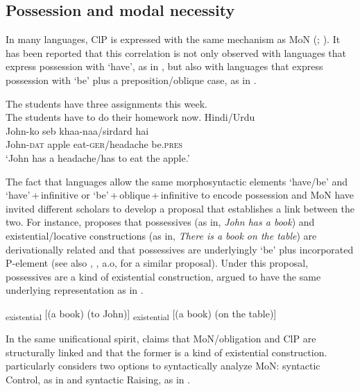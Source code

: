 \documentclass[output=paper]{langscibook}
\begin{document}
\subsection{Possession and modal necessity}\largerpage[2]
In many languages, ClP is expressed with the same mechanism as MoN (\citealt{bhatt97}; \citealt{cowperandbjorkman2016}). It has been reported that this correlation is not only observed with languages that express possession with `have', as in , but also with languages that express possession with `be' plus a preposition/oblique case, as in .

\ea\label{ex:Gebregziabher:have}
\ea The students have three assignments this week. \\ \citep[(1)]{cowperandbjorkman2016}
\ex The students have to do their homework now.
\z
\ex\label{ex:Gebregziabher:beto} Hindi/Urdu \citep[(8)]{bhatt97}\\
\gll John-ko seb khaa-naa/sirdard hai \\
John-{\scshape dat} apple eat-{\scshape ger}/headache be.{\scshape pres}\\
\glt `John has a headache/has to eat the apple.' 
\z

\begin{sloppypar}
\noindent The fact that languages allow the same morphosyntactic elements `have/be' and `have'\,+\,infinitive or `be'\,+\,oblique\,+\,infinitive to encode possession and MoN have invited different scholars to develop a proposal that establishes a link between the two. For instance, \citet{freeze92} proposes that possessives (as in, \emph{John has a book}) and existential/locative constructions (as in, \emph{There is a book on the table}) are derivationally related and that possessives are underlyingly `be' plus incorporated P-element (see also \citealt{harley1995}, \citealt{levinson2011}, a.o, for a similar proposal). Under this proposal, possessives are a kind of existential construction, argued to have the same underlying representation as in .
\end{sloppypar}

\ea\label{ex:Gebregziabher:existential}
\textsubscript{existential} [(a book) (to John)]
\textsubscript{existential} [(a book) (on the table)] 
\z
\z

\noindent In the same unificational spirit, \citet{bhatt97} claims that MoN/obligation and ClP are structurally linked and that the former is a kind of existential construction. \citeauthor{bhatt97} particularly considers two  options to syntactically analyze MoN: syntactic Control, as in  and syntactic Raising, as in .
\end{document}
